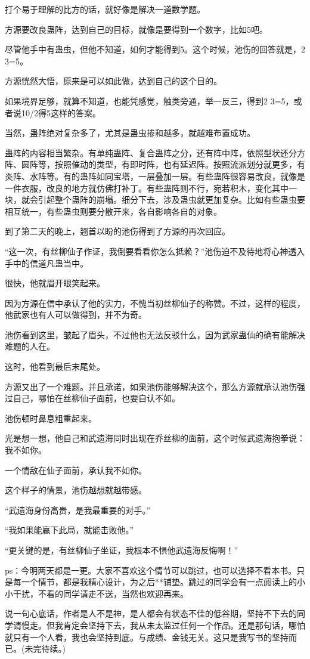 \begin{this_body}
打个易于理解的比方的话，就好像是解决一道数学题。

方源要改良蛊阵，达到自己的目标，就像是要得到一个数字，比如5吧。

尽管他手中有蛊虫，但他不知道，如何才能得到5。这个时候，池伤的回答就是，2 3=5。

方源恍然大悟，原来是可以如此做，达到自己的这个目的。

如果境界足够，就算不知道，也能凭感觉，触类旁通，举一反三，得到2 3=5，或者说10/2得5这样的答案。

当然，蛊阵绝对复杂多了，尤其是蛊虫掺和越多，就越难布置成功。

蛊阵的内容相当繁杂。有单纯蛊阵、复合蛊阵之分，还有阵中阵，依照型状还分方阵、圆阵等，按照催动的类型，有即时阵，也有延迟阵。按照流派划分就更多，有炎阵、水阵等。有的蛊阵如同宝塔，一层叠加一层。有些蛊阵很容易改良，就像是一件衣服，改良的地方就仿佛打补丁。有些蛊阵则不行，宛若积木，变化其中一块，就会引起整个蛊阵的崩塌。细分下去，涉及蛊虫就更加复杂。比如有些蛊虫要相互统一，有些蛊虫则要分散开来，各自影响各自的对象。

到了第二天的晚上，翘首以盼的池伤得到了方源的再次回应。

“这一次，有丝柳仙子作证，我倒要看看你怎么抵赖？”池伤迫不及待地将心神透入手中的信道凡蛊当中。

很快，他就眉开眼笑起来。

因为方源在信中承认了他的实力，不愧当初丝柳仙子的称赞。不过，这样的程度，他武家也有人可以做得到，并不为奇。

池伤看到这里，皱起了眉头，不过他也无法反驳什么，因为武家蛊仙的确有能解决难题的人在。

这时，他看到最后末尾处。

方源又出了一个难题。并且承诺，如果池伤能够解决这个，那么方源就承认池伤强过自己，哪怕在丝柳仙子面前，也要自认不如。

池伤顿时鼻息粗重起来。

光是想一想，他自己和武遗海同时出现在乔丝柳的面前，这个时候武遗海抱拳说：我不如你。

一个情敌在仙子面前，承认我不如你。

这个样子的情景，池伤越想就越带感。

“武遗海身份高贵，是我最重要的对手。”

“我如果能赢下此局，就能击败他。”

“更关键的是，有丝柳仙子坐证，我根本不惧他武遗海反悔啊！”

ps：今明两天都是一更。大家不喜欢这个情节可以跳过，也可以选择不看本书。只是每一个情节，都是我精心设计，为之后**铺垫。跳过的同学会有一点阅读上的小小干扰，不看的同学请走不送，当然也欢迎再来。

说一句心底话，作者是人不是神，是人都会有状态不佳的低谷期，坚持不下去的同学请慢走。但我肯定会坚持下去，我从未太监过任何一个作品。还是那句话，哪怕就只有一个人看，我也会坚持到底。与成绩、金钱无关。这只是我写书的坚持而已。(未完待续。)

\end{this_body}

